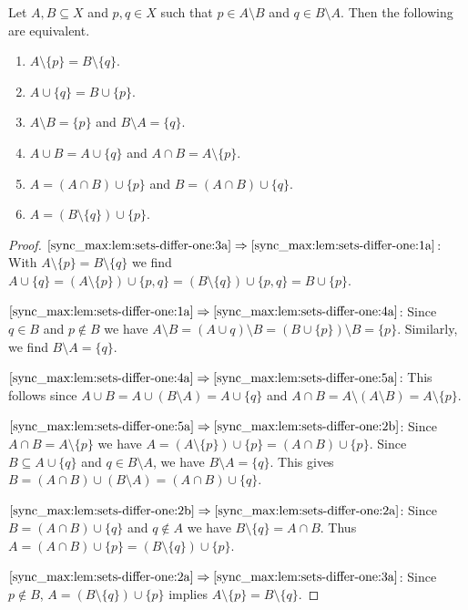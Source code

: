\begin{lemma} \label{sync_max:lem:sets-differ-one}
	Let $A,B \subseteq X$ and $p,q \in X$ such that $p \in A \setminus B$ and $q \in B \setminus A$.
	Then the following are equivalent.
 \begin{enumerate}
	\item \label{sync_max:lem:sets-differ-one:3a} $A \setminus \{p\} = B \setminus \{q\}$.
		
	\item \label{sync_max:lem:sets-differ-one:1a} $A \cup \{q\} = B \cup \{p\}$.
	
	\item \label{sync_max:lem:sets-differ-one:4a} $A \setminus B = \{p\}$ and $B \setminus A = \{q\}$.
	
	\item \label{sync_max:lem:sets-differ-one:5a} $A \cup B = A \cup \{q\}$ and $A \cap B = A \setminus \{p\}$.
		
	\item \label{sync_max:lem:sets-differ-one:2b} $A = (A \cap B) \cup \{p\}$
	and $B = (A \cap B)\cup \{q\}$.
	
	\item \label{sync_max:lem:sets-differ-one:2a} $A = ( B \setminus \{q\} ) \cup \{p\}$.	
\end{enumerate}
\end{lemma}
\begin{proof}
$\ref{sync_max:lem:sets-differ-one:3a}\Rightarrow\ref{sync_max:lem:sets-differ-one:1a}$: 
With $A \setminus \{p\} = B \setminus \{q\}$ we find
$
A \cup \{q\} = ( A \setminus \{p\} ) \cup \{p,q\}
= (B \setminus \{q\} ) \cup \{p,q\}
=  B \cup \{p\}.
$

$\ref{sync_max:lem:sets-differ-one:1a}\Rightarrow\ref{sync_max:lem:sets-differ-one:4a}$: 
Since $q \in B$ and $p \notin B$
we have $A \setminus B = (A \cup {q}) \setminus B = (B \cup \{p\}) \setminus B = \{p\}$.
Similarly, we find $B \setminus A = \{q\}$.

$\ref{sync_max:lem:sets-differ-one:4a}\Rightarrow\ref{sync_max:lem:sets-differ-one:5a}$: This follows since
$A \cup B = A \cup (B \setminus A) = A \cup \{q\}$
and $A \cap B = A \setminus (A \setminus B) = A \setminus \{p\}$.

$\ref{sync_max:lem:sets-differ-one:5a} \Rightarrow\ref{sync_max:lem:sets-differ-one:2b}$:
Since $A \cap B = A \setminus \{p\}$
we have $A = ( A \setminus \{p\} ) \cup \{p\} = (A \cap B) \cup \{p\}$.
Since $B \subseteq A \cup \{q\}$ and $q \in B \setminus A$,
we have $B \setminus A = \{q\}$.
This gives $B = (A \cap B) \cup (B \setminus A) = (A \cap B)\cup \{q\}$.

$\ref{sync_max:lem:sets-differ-one:2b} \Rightarrow\ref{sync_max:lem:sets-differ-one:2a}$:
Since $B = (A \cap B) \cup \{q\}$ and $q \notin A$ 
we have $B \setminus\{q\} = A \cap B$.
Thus $A = (A \cap B) \cup \{p\} = (B \setminus \{q\}) \cup \{p\}$.

$\ref{sync_max:lem:sets-differ-one:2a}\Rightarrow\ref{sync_max:lem:sets-differ-one:3a}$:
Since $p \notin B$, $A = ( B \setminus \{q\} ) \cup \{p\}$
implies $A \setminus \{p\} = B \setminus \{q\}$.
\end{proof}


